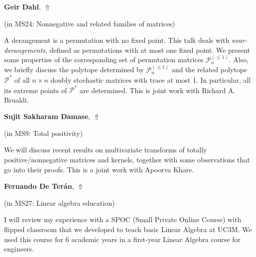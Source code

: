 \documentclass[ILAS2025-program.tex]{subfiles}
\begin{document}
\hypertarget{down0200}{}\begin{ilasabstract}
    
\textbf{Geir Dahl},  \hfill \hyperlink{up0200}{$\Uparrow$}
    
    
(in {\color{mstitle}MS24: Nonnegative and related families of matrices})
        
\mtskip
    A derangement is a permutation with no fixed point. This talk deals with  {\em near-derangements}, defined as permutations with at most one fixed point. We present some properties of  the corresponding set of permutation matrices $\mathcal{P}^{(\le 1)}_n$. 
  Also, we briefly discuss  the polytope determined by $\mathcal{P}^{(\le 1)}_n$ and the related polytope $\mathcal{P}^*$ of  all $n\times n$  doubly stochastic matrices with trace at most 1.
  In particular, all its  extreme points of $\mathcal{P}^*$ are determined. 
This is joint work with Richard A. Brualdi.

\end{ilasabstract}
    

\hypertarget{down0012}{}\begin{ilasabstract}
    
\textbf{Sujit Sakharam Damase},  \hfill \hyperlink{up0012}{$\Uparrow$}
    
    
(in {\color{mstitle}MS9: Total positivity})
        
\mtskip
    We will discuss recent results on multivariate transforms of totally positive/nonnegative matrices and kernels, together with some observations that go into their proofs. This is a joint work with Apoorva Khare.

\end{ilasabstract}
    

\hypertarget{down0259}{}\begin{ilasabstract}
    
\textbf{Fernando De Terán},  \hfill \hyperlink{up0259}{$\Uparrow$}
    
    
(in {\color{mstitle}MS27: Linear algebra education})
        
\mtskip
    I will review my experience with a SPOC (Small Private Online Course) with flipped classroom that we developed to teach basic Linear Algebra at UC3M. We used this course for 6 academic years in a first-year Linear Algebra course for engineers.
\end{ilasabstract}
    
\end{document}
